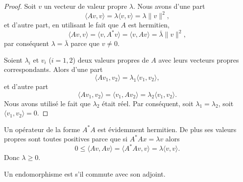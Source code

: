 \begin{proof}
    Soit \( v\) un vecteur de valeur propre \( \lambda\). Nous avons d'une part
    \begin{equation}
        \langle Av, v\rangle =\lambda\langle v, v\rangle =\lambda\| v \|^2,
    \end{equation}
    et d'autre part, en utilisant le fait que \( A\) est hermitien,
    \begin{equation}
        \langle Av, v\rangle =\langle v, A^*v\rangle =\langle v, Av\rangle =\bar\lambda\| v \|^2,
    \end{equation}
    par conséquent \( \lambda=\bar\lambda\) parce que \( v\neq 0\).

    Soient \( \lambda_i\) et \( v_i\) (\( i=1,2\)) deux valeurs propres de \( A\) avec leurs vecteurs propres correspondants. Alors d'une part
    \begin{equation}
        \langle Av_1, v_2\rangle =\lambda_1\langle v_1, v_2\rangle ,
    \end{equation}
    et d'autre part
    \begin{equation}
        \langle Av_1, v_2\rangle =\langle v_1, Av_2\rangle =\lambda_2\langle v_1, v_2\rangle .
    \end{equation}
    Nous avons utilisé le fait que \( \lambda_2\) était réel. Par conséquent, soit \( \lambda_1=\lambda_2\), soit \( \langle v_1, v_2\rangle =0\).
\end{proof}

\begin{remark}      \label{REMooMLBCooTuKFmz}
    Un opérateur de la forme \( A^*A\) est évidemment hermitien. De plus ses valeurs propres sont toutes positives parce que si \( A^*Ax=\lambda v\) alors
    \begin{equation}
        0\leq \langle Av, Av\rangle =\langle A^*Av, v\rangle =\lambda\langle v, v\rangle .
    \end{equation}
    Donc \( \lambda\geq 0\).
\end{remark}

\begin{definition}  \label{DefWQNooKEeJzv}
    Un endomorphisme est  s'il commute avec son adjoint.
\end{definition}

